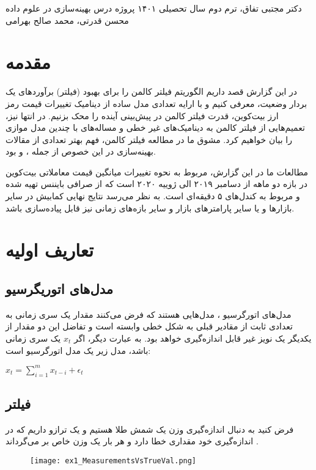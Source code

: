\documentclass{scribe-cgenomics}
\begin{document}
{دکتر مجتبی تفاق، ترم دوم سال تحصیلی ۱۴۰۱}
{پروژه درس بهینه‌سازی در علوم داده}
{محسن قدرتی، محمد صالح بهرامی}


\section{مقدمه}
در این گزارش قصد داریم الگوریتم فیلتر کالمن 
\cite{mainkalman}
را برای بهبود (فیلتر) برآوردهای یک بردار وضعیت، معرفی کنیم و با ارایه تعدادی مدل ساده از دینامیک تغییرات قیمت رمز ارز بیت‌کوین، قدرت فیلتر کالمن در پیش‌بینی آینده را محک بزنیم. در انتها نیز، تعمیم‌هایی از فیلتر کالمن به دینامیک‌های غیر خطی و مساله‌های با چندین مدل موازی را بیان خواهیم کرد. مشوق ما در مطالعه فیلتر کالمن، فهم بهتر تعدادی از مقالات بهینه‌سازی  در این خصوص از جمله
\cite{boyd1}،
\cite{boyd2}
و
\cite{boyd3}
بود.

مطالعات ما در این گزارش، مربوط به نحوه تغییرات میانگین قیمت معاملاتی بیت‌کوین در بازه دو ماهه از دسامبر ۲۰۱۹ الی ژوییه ۲۰۲۰ است که از صرافی بایننس تهیه شده و مربوط به کندل‌های ۵ دقیقه‌ای است. به نظر می‌رسد نتایج نهایی کمابیش در سایر بازارها و یا سایر پارامترهای بازار و سایر بازه‌های زمانی نیز قابل پیاده‌سازی باشد.

\section{تعاریف اولیه}
\subsection{مدل‌های اتوریگرسیو}
مدل‌های اتورگرسیو
\cite{autoreg}، مدل‌هایی هستند که فرض می‌کنند مقدار یک سری زمانی به تعدادی ثابت از مقادیر قبلی به شکل خطی وابسته است و تفاضل این دو مقدار از یکدیگر یک نویز غیر قابل اندازه‌گیری خواهد بود. به عبارت دیگر، اگر
$x_t$
یک سری زمانی باشد، مدل زیر یک مدل اتورگرسیو است:

\begin{center}
$
x_t = \sum_{i = 1}^{m}x_{t-i} + \epsilon_t
$
\end{center}


\subsection{فیلتر}
فرض کنید به دنبال اندازه‌گیری وزن یک شمش طلا هستیم و یک ترازو داریم که در اندازه‌گیری خود مقداری خطا دارد و هر بار یک وزن خاص بر می‌گرداند
\cite{kalman}.

\begin{figure}
\texttt{[image: ex1\_MeasurementsVsTrueVal.png]}
\centering
\end{figure}
\end{document}

